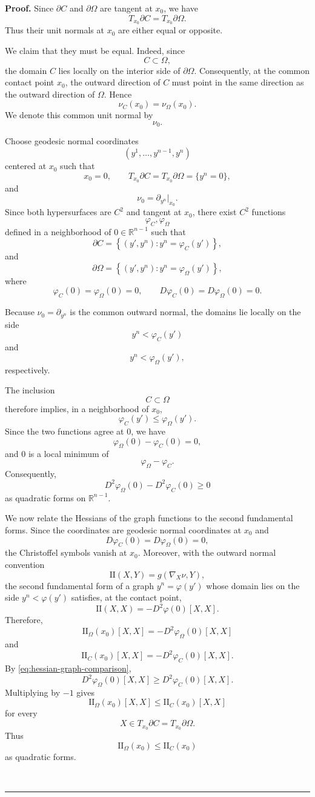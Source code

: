 \documentclass{article}
\newenvironment{proof}[1][Proof]{\textbf{#1.} }{\ \rule{0.5em}{0.5em}}
\begin{document}
\begin{proof}
Since $\partial C$ and $\partial\Omega$ are tangent at $x_0$, we have
\[
T_{x_0}\partial C
=
T_{x_0}\partial\Omega.
\]
Thus their unit normals at $x_0$ are either equal or opposite.

We claim that they must be equal. Indeed, since
\[
C\subset\Omega,
\]
the domain $C$ lies locally on the interior side of $\partial\Omega$.
Consequently, at the common contact point $x_0$, the outward direction
of $C$ must point in the same direction as the outward direction of
$\Omega$. Hence
\[
\nu_C(x_0)=\nu_\Omega(x_0).
\]
We denote this common unit normal by
\[
\nu_0.
\]

Choose geodesic normal coordinates
\[
(y^1,\ldots,y^{n-1},y^n)
\]
centered at $x_0$ such that
\[
x_0=0,
\qquad
T_{x_0}\partial C
=
T_{x_0}\partial\Omega
=
\{y^n=0\},
\]
and
\[
\nu_0=\partial_{y^n}\big|_{x_0}.
\]
Since both hypersurfaces are $C^2$ and tangent at $x_0$, there exist
$C^2$ functions
\[
\varphi_C,\varphi_\Omega
\]
defined in a neighborhood of $0\in\mathbb R^{n-1}$ such that
\[
\partial C
=
\left\{
(y',y^n):y^n=\varphi_C(y')
\right\},
\]
and
\[
\partial\Omega
=
\left\{
(y',y^n):y^n=\varphi_\Omega(y')
\right\},
\]
where
\[
\varphi_C(0)=\varphi_\Omega(0)=0,
\qquad
D\varphi_C(0)=D\varphi_\Omega(0)=0.
\]

Because $\nu_0=\partial_{y^n}$ is the common outward normal, the
domains lie locally on the side
\[
y^n<\varphi_C(y')
\]
and
\[
y^n<\varphi_\Omega(y'),
\]
respectively.

The inclusion
\[
C\subset\Omega
\]
therefore implies, in a neighborhood of $x_0$,
\[
\varphi_C(y')
\leq
\varphi_\Omega(y').
\]
Since the two functions agree at $0$, we have
\[
\varphi_\Omega(0)-\varphi_C(0)=0,
\]
and $0$ is a local minimum of
\[
\varphi_\Omega-\varphi_C.
\]
Consequently,
\begin{equation}
D^2\varphi_\Omega(0)
-
D^2\varphi_C(0)
\geq0
\label{eq:hessian-graph-comparison}
\end{equation}
as quadratic forms on $\mathbb R^{n-1}$.

We now relate the Hessians of the graph functions to the second
fundamental forms. Since the coordinates are geodesic normal
coordinates at $x_0$ and
\[
D\varphi_C(0)
=
D\varphi_\Omega(0)
=
0,
\]
the Christoffel symbols vanish at $x_0$. Moreover, with the outward
normal convention
\[
\mathrm{II}(X,Y)
=
g(\nabla_X\nu,Y),
\]
the second fundamental form of a graph
$y^n=\varphi(y')$ whose domain lies on the side $y^n<\varphi(y')$
satisfies, at the contact point,
\begin{equation}
\mathrm{II}(X,X)
=
-D^2\varphi(0)[X,X].
\label{eq:II-graph}
\end{equation}
Therefore,
\[
\mathrm{II}_{\Omega}(x_0)[X,X]
=
-D^2\varphi_\Omega(0)[X,X]
\]
and
\[
\mathrm{II}_{C}(x_0)[X,X]
=
-D^2\varphi_C(0)[X,X].
\]
By \eqref{eq:hessian-graph-comparison},
\[
D^2\varphi_\Omega(0)[X,X]
\geq
D^2\varphi_C(0)[X,X].
\]
Multiplying by $-1$ gives
\[
\mathrm{II}_{\Omega}(x_0)[X,X]
\leq
\mathrm{II}_{C}(x_0)[X,X]
\]
for every
\[
X\in T_{x_0}\partial C
=
T_{x_0}\partial\Omega.
\]
Thus
\[
\mathrm{II}_{\Omega}(x_0)
\leq
\mathrm{II}_{C}(x_0)
\]
as quadratic forms.


\end{proof}
\end{document}
